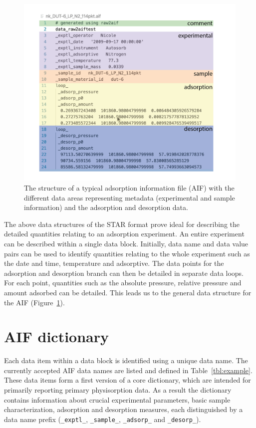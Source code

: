 \documentclass[journal=langd5,manuscript=article]{achemso}
\begin{document}
  
  \begin{figure}[htb]
    \includegraphics{./figures/structure-01.png}
      \caption{The structure of a typical adsorption information file (AIF) with the different data areas representing metadata (experimental and sample information) and the adsorption and desorption data.}
      \label{fgr:datastructure}
    \end{figure}


The above data structures of the STAR format prove ideal for describing the detailed quantities relating to an adsorption experiment.
An entire experiment can be described within a single data block.
Initially, data name and data value pairs can be used to identify quantities relating to the whole experiment such as the date and time, temperature and adsorptive.
The data points for the adsorption and desorption branch can then be detailed in separate data loops.
For each point, quantities such as the absolute pressure, relative pressure and amount adsorbed can be detailed.
This leads us to the general data structure for the AIF (Figure~\ref{fgr:datastructure}).


\section{AIF dictionary}
Each data item within a data block is identified using a unique data name.
The currently accepted AIF data names are listed and defined in Table~\ref{tbl:example}.
These data items form a first version of a core dictionary, which are intended for primarily reporting primary physisorption data.
As a result the dictionary contains information about crucial experimental parameters, basic sample characterization, adsorption and desorption measures, each distinguished by a data name prefix (\texttt{\_exptl\_}, \texttt{\_sample\_}, \texttt{\_adsorp\_} and \texttt{\_desorp\_}).
\end{document}
